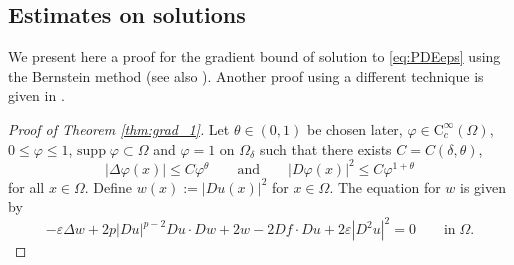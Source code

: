 \documentclass[12pt,reqno]{amsart}
\numberwithin{figure}{section}
\theoremstyle{plain}
\theoremstyle{remark}
\numberwithin{equation}{section}
\begin{document}



\begin{appendices}
\subsection*{Estimates on solutions}
We present here a proof for the gradient bound of solution to \eqref{eq:PDEeps} using the Bernstein method (see also \cite{Lasry1989,lions_quelques_1985}). Another proof using a different technique is given in \cite{Armstrong2015a}.

\begin{proof}[Proof of Theorem \ref{thm:grad_1}] Let $\theta\in (0,1)$ be chosen later, $\varphi\in \mathrm{C}_c^\infty(\Omega)$, $0\leq \varphi\leq 1$, $\mathrm{supp}\;\varphi\subset \Omega$ and $\varphi = 1$ on $\Omega_\delta$ such that there exists $C = C(\delta,\theta)$,
\begin{equation}\label{e:ass_power}
    |\Delta \varphi(x)| \leq C\varphi^\theta \qquad\text{and}\qquad |D \varphi(x)|^2 \leq C\varphi^{1+\theta}
\end{equation}
for all $x\in \Omega$.
Define $w(x) := |Du(x)|^2$ for $x \in \Omega$. The equation for $w$ is given by
\begin{equation*}
    -\varepsilon \Delta w + 2 p|D u|^{p-2}D u \cdot D w + 2  w - 2 D f\cdot D u + 2 \varepsilon |D^2u|^2 = 0 \qquad\text{in}\;\Omega.
\end{equation*}


\end{proof}
\end{appendices}
\end{document}
